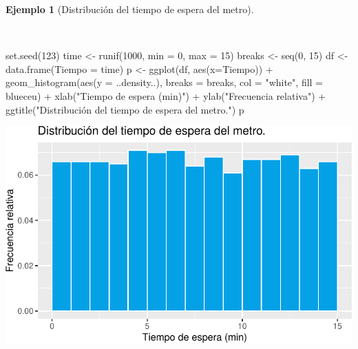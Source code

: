 \documentclass[
  a4paper,
]{scrreport}
\newenvironment{Shaded}{\begin{snugshade}}{\end{snugshade}}
\newcommand{\AttributeTok}[1]{\textcolor[rgb]{0.40,0.45,0.13}{#1}}
\newcommand{\DecValTok}[1]{\textcolor[rgb]{0.68,0.00,0.00}{#1}}
\newcommand{\FunctionTok}[1]{\textcolor[rgb]{0.28,0.35,0.67}{#1}}
\newcommand{\NormalTok}[1]{\textcolor[rgb]{0.00,0.23,0.31}{#1}}
\newcommand{\OtherTok}[1]{\textcolor[rgb]{0.00,0.23,0.31}{#1}}
\newcommand{\SpecialCharTok}[1]{\textcolor[rgb]{0.37,0.37,0.37}{#1}}
\newcommand{\StringTok}[1]{\textcolor[rgb]{0.13,0.47,0.30}{#1}}
\theoremstyle{plain}
\theoremstyle{definition}
\newtheorem{example}{Ejemplo}[chapter]
\theoremstyle{definition}
\theoremstyle{remark}
\begin{document}
\begin{example}[Distribución del tiempo de espera del
metro]\protect\hypertarget{exm-distribucion-tiempo-espera-metro}{}\label{exm-distribucion-tiempo-espera-metro}

~

\begin{Shaded}
\begin{Highlighting}[]
\FunctionTok{set.seed}\NormalTok{(}\DecValTok{123}\NormalTok{)}
\NormalTok{time }\OtherTok{\textless{}{-}} \FunctionTok{runif}\NormalTok{(}\DecValTok{1000}\NormalTok{, }\AttributeTok{min =} \DecValTok{0}\NormalTok{, }\AttributeTok{max =} \DecValTok{15}\NormalTok{)}
\NormalTok{breaks }\OtherTok{\textless{}{-}} \FunctionTok{seq}\NormalTok{(}\DecValTok{0}\NormalTok{, }\DecValTok{15}\NormalTok{)}
\NormalTok{df }\OtherTok{\textless{}{-}} \FunctionTok{data.frame}\NormalTok{(}\AttributeTok{Tiempo =}\NormalTok{ time)}
\NormalTok{p }\OtherTok{\textless{}{-}} \FunctionTok{ggplot}\NormalTok{(df, }\FunctionTok{aes}\NormalTok{(}\AttributeTok{x=}\NormalTok{Tiempo)) }\SpecialCharTok{+}
    \FunctionTok{geom\_histogram}\NormalTok{(}\FunctionTok{aes}\NormalTok{(}\AttributeTok{y =}\NormalTok{ ..density..), }\AttributeTok{breaks =}\NormalTok{ breaks, }\AttributeTok{col =} \StringTok{"white"}\NormalTok{, }\AttributeTok{fill =}\NormalTok{ blueceu) }\SpecialCharTok{+}
    \FunctionTok{xlab}\NormalTok{(}\StringTok{"Tiempo de espera (min)"}\NormalTok{) }\SpecialCharTok{+}
    \FunctionTok{ylab}\NormalTok{(}\StringTok{"Frecuencia relativa"}\NormalTok{) }\SpecialCharTok{+}
    \FunctionTok{ggtitle}\NormalTok{(}\StringTok{"Distribución del tiempo de espera del metro."}\NormalTok{)}
\NormalTok{p}
\end{Highlighting}
\end{Shaded}

\includegraphics{02-estadistica-descriptiva_files/figure-pdf/histograma-tiempo-espera-metro-1.pdf}

\end{example}
\end{document}

